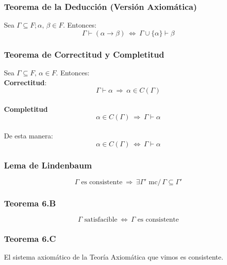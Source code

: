 \documentclass{article}
\newcommand{\comma}{,\,}                                %
\newcommand{\tq}{/\,}                                   %
\newcommand{\Rightarrows}{\: \Rightarrow \:}            %
\newcommand{\Leftrightarrows}{\: \Leftrightarrow \:}    %
\begin{document}
\subsubsection{Teorema de la Deducción (Versión Axiomática)}
Sea $\Gamma \subseteq F; \alpha \comma \beta \in F$. Entonces:
\begin{equation*}
    \Gamma \vdash (\alpha \rightarrow \beta) \Leftrightarrows \Gamma \cup \{\alpha\} \vdash \beta
\end{equation*}

\subsubsection{Teorema de Correctitud y Completitud}
Sea $\Gamma \subseteq F \comma \alpha \in F$. Entonces:
\\\textbf{Correctitud}:
\begin{equation*}
    \Gamma \vdash \alpha \Rightarrows \alpha \in C(\Gamma)
\end{equation*}
\\\textbf{Completitud}
\begin{equation*}
    \alpha \in C(\Gamma) \Rightarrows \Gamma \vdash \alpha 
\end{equation*}
\leavevmode\\
De esta manera:
\begin{equation*}
    \alpha \in C(\Gamma) \Leftrightarrows \Gamma \vdash \alpha 
\end{equation*}

\subsubsection{Lema de Lindenbaum}
\begin{equation*}
    \Gamma \text{ es consistente} \Rightarrows \exists \Gamma' \text{ mc} \tq \Gamma \subseteq \Gamma'
\end{equation*}

\subsubsection{Teorema 6.B}
\begin{equation*}
    \Gamma \text{ satisfacible} \Leftrightarrows \Gamma \text{ es consistente}
\end{equation*}

\subsubsection{Teorema 6.C}
El sistema axiomático de la Teoría Axiomática que vimos es consistente.
\end{document}

